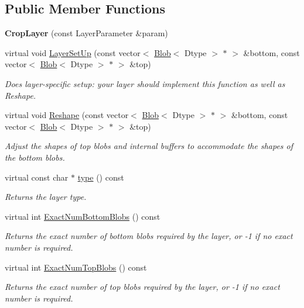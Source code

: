 \subsection*{Public Member Functions}
\begin{DoxyCompactItemize}
\item 
{\bfseries Crop\+Layer} (const Layer\+Parameter \&param)\hypertarget{classcaffe_1_1CropLayer_a4baa861ad4fc049250b41111cb9588c2}{}\label{classcaffe_1_1CropLayer_a4baa861ad4fc049250b41111cb9588c2}

\item 
virtual void \hyperlink{classcaffe_1_1CropLayer_a977681a1a0b51be5bde2514542d8327c}{Layer\+Set\+Up} (const vector$<$ \hyperlink{classcaffe_1_1Blob}{Blob}$<$ Dtype $>$ $\ast$ $>$ \&bottom, const vector$<$ \hyperlink{classcaffe_1_1Blob}{Blob}$<$ Dtype $>$ $\ast$ $>$ \&top)
\begin{DoxyCompactList}\small\item\em Does layer-\/specific setup\+: your layer should implement this function as well as Reshape. \end{DoxyCompactList}\item 
virtual void \hyperlink{classcaffe_1_1CropLayer_a552d5c9829315e2fc3343b2f4965b1c8}{Reshape} (const vector$<$ \hyperlink{classcaffe_1_1Blob}{Blob}$<$ Dtype $>$ $\ast$ $>$ \&bottom, const vector$<$ \hyperlink{classcaffe_1_1Blob}{Blob}$<$ Dtype $>$ $\ast$ $>$ \&top)
\begin{DoxyCompactList}\small\item\em Adjust the shapes of top blobs and internal buffers to accommodate the shapes of the bottom blobs. \end{DoxyCompactList}\item 
virtual const char $\ast$ \hyperlink{classcaffe_1_1CropLayer_a1905800ea2ab1014ce9b67a82358cfdc}{type} () const \hypertarget{classcaffe_1_1CropLayer_a1905800ea2ab1014ce9b67a82358cfdc}{}\label{classcaffe_1_1CropLayer_a1905800ea2ab1014ce9b67a82358cfdc}

\begin{DoxyCompactList}\small\item\em Returns the layer type. \end{DoxyCompactList}\item 
virtual int \hyperlink{classcaffe_1_1CropLayer_a1c74edc80c22d805a96b00fefceb3286}{Exact\+Num\+Bottom\+Blobs} () const 
\begin{DoxyCompactList}\small\item\em Returns the exact number of bottom blobs required by the layer, or -\/1 if no exact number is required. \end{DoxyCompactList}\item 
virtual int \hyperlink{classcaffe_1_1CropLayer_a3335d668f97fe9582e29a684922adc97}{Exact\+Num\+Top\+Blobs} () const 
\begin{DoxyCompactList}\small\item\em Returns the exact number of top blobs required by the layer, or -\/1 if no exact number is required. \end{DoxyCompactList}\end{DoxyCompactItemize}
